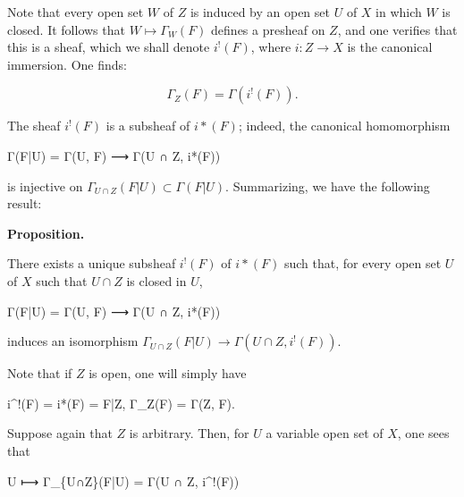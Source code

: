 \documentclass[
]{article}
\newenvironment{Shaded}{}{}
\newcommand{\NormalTok}[1]{#1}
\begin{document}
Note that every open set \(W\) of \(Z\) is induced by an open set \(U\)
of \(X\) in which \(W\) is closed. It follows that
\(W \mapsto \Gamma_{W}(F)\) defines a presheaf on \(Z\), and one
verifies that this is a sheaf, which we shall denote \(i^{!}(F)\), where
\(i: Z \to X\) is the canonical immersion. One finds:

\[
\Gamma_{Z}(F) = \Gamma(i^{!}(F)).
\]

The sheaf \(i^{!}(F)\) is a subsheaf of \(i*(F)\); indeed, the canonical
homomorphism

\begin{Shaded}
\begin{Highlighting}[]
\NormalTok{Γ(F|U) = Γ(U, F) ⟶ Γ(U ∩ Z, i*(F))}
\end{Highlighting}
\end{Shaded}

is injective on \(\Gamma_{U\cap Z}(F|U) \subset \Gamma(F|U)\).
Summarizing, we have the following result:

\textbf{Proposition.}

There exists a unique subsheaf \(i^{!}(F)\) of \(i*(F)\) such that, for
every open set \(U\) of \(X\) such that \(U \cap Z\) is closed in \(U\),

\begin{Shaded}
\begin{Highlighting}[]
\NormalTok{Γ(F|U) = Γ(U, F) ⟶ Γ(U ∩ Z, i*(F))}
\end{Highlighting}
\end{Shaded}

induces an isomorphism
\(\Gamma_{U\cap Z}(F|U) \to \Gamma(U \cap Z, i^{!}(F))\).

Note that if \(Z\) is open, one will simply have

\begin{Shaded}
\begin{Highlighting}[]
\NormalTok{i\^{}!(F) = i*(F) = F|Z, Γ\_Z(F) = Γ(Z, F).}
\end{Highlighting}
\end{Shaded}

Suppose again that \(Z\) is arbitrary. Then, for \(U\) a variable open
set of \(X\), one sees that

\begin{Shaded}
\begin{Highlighting}[]
\NormalTok{U ⟼ Γ\_\{U∩Z\}(F|U) = Γ(U ∩ Z, i\^{}!(F))}
\end{Highlighting}
\end{Shaded}
\end{document}
